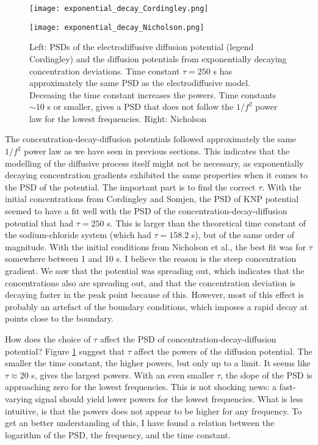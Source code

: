 \documentclass{article}
\begin{document}
\begin{figure}
 
   \begin{minipage}[b]{0.45\textwidth}
    \texttt{[image: exponential\_decay\_Cordingley.png]}
  \end{minipage}
     \begin{minipage}[b]{0.45\textwidth}
    \texttt{[image: exponential\_decay\_Nicholson.png]}
  \end{minipage}
  \caption{Left: PSDs of the electrodiffusive diffusion potential (legend Cordingley) and the diffusion potentials from exponentially decaying concentration deviations. Time constant $\tau = 250$ s has approximately the same PSD as the electrodiffusive model. Deceasing the time constant increases the powers. Time constants $\sim 10$ s or smaller, gives a PSD that does not follow the $1/f^2$ power law for the lowest frequencies. Right: Nicholson}
  \label{fig:exponential_decay}
\end{figure}

The concentration-decay-diffusion potentials followed approximately the same $1/f^2$ power law as we have seen in previous sections. This indicates that the modelling of the diffusive process itself might not be necessary, as exponentially decaying concentration gradients exhibited the same properties when it comes to the PSD of the potential. The important part is to find the correct $\tau$. With the initial concentrations from Cordingley and Somjen, the PSD of KNP potential seemed to have a fit well with the PSD of the concentration-decay-diffusion potential that had $\tau=250$ s. This is larger than the theoretical time constant of the sodium-chloride system (which had $\tau = 158.2$ s), but of the same order of magnitude. With the initial conditions from Nicholson et al., the best fit was for $\tau$ somewhere between 1 and 10 s. I believe the reason is the steep concentration gradient. We saw that the potential was spreading out, which indicates that the concentrations also are spreading out, and that the concentration deviation is decaying faster in the peak point because of this. However, most of this effect is probably an artefact of the boundary conditions, which imposes a rapid decay at points close to the boundary.


How does the choice of $\tau$ affect the PSD of concentration-decay-diffusion potential? Figure \ref{fig:exponential_decay} suggest that $\tau$ affect the powers of the diffusion potential. The smaller the time constant, the higher powers, but only up to a limit. It seems like $\tau \approx 20 $ s, gives the largest powers. With an even smaller $\tau$, the slope of the PSD is approaching zero for the lowest frequencies. This is not shocking news: a fast-varying signal should yield lower powers for the lowest frequencies. What is less intuitive, is that the powers does not appear to be higher for any frequency. To get an better understanding of this, I have found a relation between the logarithm of the PSD, the frequency, and the time constant. 
\end{document}
